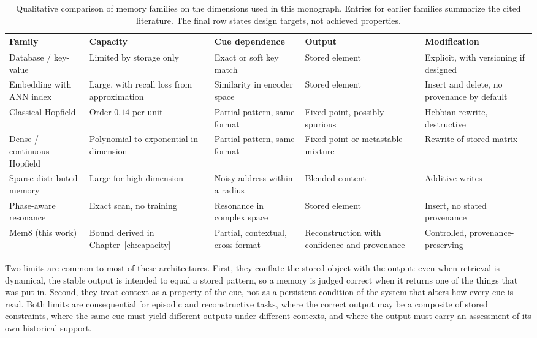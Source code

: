 \begin{table}[t]
\centering
\small
\renewcommand{\arraystretch}{1.25}
\begin{tabularx}{\textwidth}{@{}l>{\raggedright\arraybackslash}X>{\raggedright\arraybackslash}X>{\raggedright\arraybackslash}X>{\raggedright\arraybackslash}X@{}}
\toprule
Family & Capacity & Cue dependence & Output & Modification\\
\midrule
Database / key-value & Limited by storage only & Exact or soft key match & Stored element & Explicit, with versioning if designed\\
Embedding with ANN index & Large, with recall loss from approximation & Similarity in encoder space & Stored element & Insert and delete, no provenance by default\\
Classical Hopfield & Order $0.14$ per unit \cite{amit1985} & Partial pattern, same format & Fixed point, possibly spurious & Hebbian rewrite, destructive\\
Dense / continuous Hopfield & Polynomial to exponential in dimension \cite{krotov2016,demircigil2017,ramsauer2021} & Partial pattern, same format & Fixed point or metastable mixture & Rewrite of stored matrix\\
Sparse distributed memory & Large for high dimension \cite{kanerva1988} & Noisy address within a radius & Blended content & Additive writes\\
Phase-aware resonance \cite{listopad2025} & Exact scan, no training & Resonance in complex space & Stored element & Insert, no stated provenance\\
Mem8 (this work) & Bound derived in Chapter~\ref{ch:capacity} & Partial, contextual, cross-format & Reconstruction with confidence and provenance & Controlled, provenance-preserving\\
\bottomrule
\end{tabularx}
\caption{Qualitative comparison of memory families on the dimensions used in this monograph. Entries for earlier families summarize the cited literature. The final row states design targets, not achieved properties.}\label{tab:compare}
\end{table}

Two limits are common to most of these architectures. First, they conflate the stored object with the output: even when retrieval is dynamical, the stable output is intended to equal a stored pattern, so a memory is judged correct when it returns one of the things that was put in. Second, they treat context as a property of the cue, not as a persistent condition of the system that alters how every cue is read. Both limits are consequential for episodic and reconstructive tasks, where the correct output may be a composite of stored constraints, where the same cue must yield different outputs under different contexts, and where the output must carry an assessment of its own historical support.

